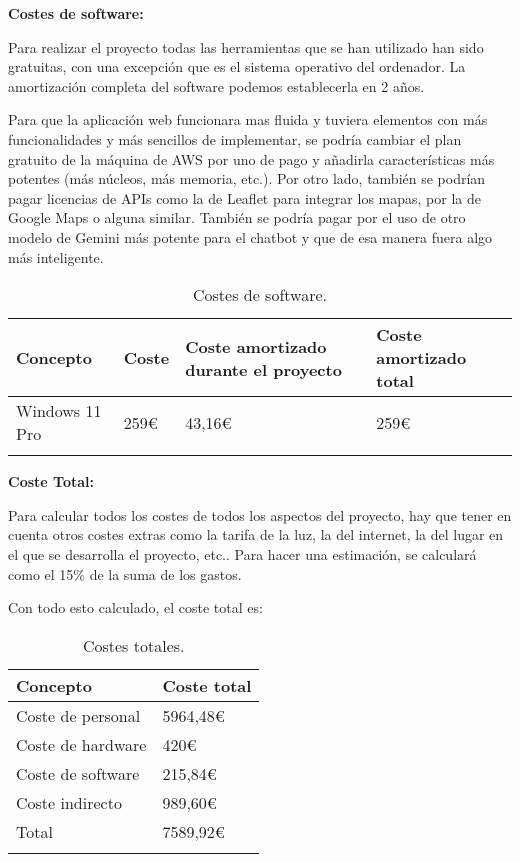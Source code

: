 \textbf{Costes de software:}

Para realizar el proyecto todas las herramientas que se han utilizado han sido gratuitas, con una excepción que es el sistema operativo del ordenador. La amortización completa del software podemos establecerla en 2 años.

Para que la aplicación web funcionara mas fluida y tuviera elementos con más funcionalidades y más sencillos de implementar, se podría cambiar el plan gratuito de la máquina de AWS por uno de pago y añadirla características más potentes (más núcleos, más memoria, etc.). Por otro lado, también se podrían pagar licencias de APIs como la de Leaflet para integrar los mapas, por la de Google Maps o alguna similar. También se podría pagar por el uso de otro modelo de Gemini más potente para el chatbot y que de esa manera fuera algo más inteligente. 

\begin{longtable}{@{} p{4cm} p{1cm} p{3cm} p{3cm} @{}}
  \toprule
  \rowcolor{gray!20}
  Concepto & Coste & Coste amortizado durante el proyecto & Coste amortizado total\\ 
  \midrule
  \endhead
  
  Windows 11 Pro  & 259€ & 43,16€ & 259€\\ 
  \midrule

  
  \bottomrule
  \caption{Costes de software.}
\end{longtable}

\newpage

\textbf{Coste Total:}

Para calcular todos los costes de todos los aspectos del proyecto, hay que tener en cuenta otros costes extras como la tarifa de la luz, la del internet, la del lugar en el que se desarrolla el proyecto, etc.. Para hacer una estimación, se calculará como el 15\% de la suma de los gastos.

Con todo esto calculado, el coste total es:

\begin{longtable}{@{} p{6cm} p{3cm} @{}}
  \toprule
  \rowcolor{gray!20}
  Concepto & Coste total \\ 
  \midrule
  \endhead
  Coste de personal  & 5964,48€ \\ 
  \midrule

  Coste de hardware  & 420€ \\ 
  \midrule

  Coste de software & 215,84€ \\ 
  \midrule

  Coste indirecto & 989,60€ \\ 
  \midrule
  \midrule

  \rowcolor{blue!20}
  Total & 7589,92€ \\

  \bottomrule
  \caption{Costes totales.}
\end{longtable}


